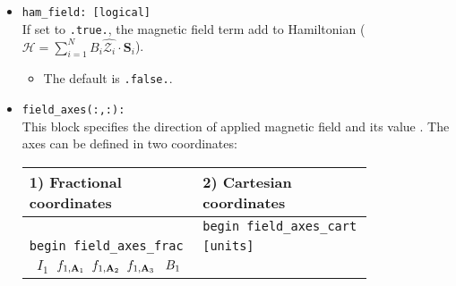 \documentclass[10pt]{report}
\def\la{\large}
\begin{document}
\begin{itemize}
\begin{itemize} [label=\adfhalfrightarrowhead]
\item {\tt ev,ang} (default)
\item {\tt ev,bohr}
\item {\tt ryd,ang} 
\item {\tt ryd,bohr}
\end{itemize}
The order of length and parameter units is not important.
If {\tt units} not present, the default value is taken.
If one of the units is not specified, the default value is set to that.
\item {\tt ham\_field: [logical]}                          \\
If set to {\tt .true.}, the magnetic field term add to Hamiltonian
($\mathcal{H}=\sum_{i=1}^{N}B_i\hat{\mathcal{Z}_{i}}\cdot\textbf{S}_i$).
\begin{itemize} [label=\adfhalfrightarrowhead]
\item The default is {\tt .false.}.
\end{itemize}
\item {\tt field\_axes(:,:):}                   \\
This block specifies the direction of applied magnetic field and its value . The axes can be defined in two coordinates:
\begin{center}
    \begin{tabular}{p{0.4\linewidth}p{0.4\linewidth}}
        \toprule
        \multicolumn{1}{l}{\la 1) Fractional coordinates} & \multicolumn{1}{l}{\la 2) Cartesian coordinates} \\ \midrule
                                 & {\tt begin field\_axes\_cart} \\
         {\tt begin field\_axes\_frac} & {\tt [units]}                   \\
        {\tt \hspace{0.2cm} $I_{1}$\hspace{0.3cm}  $ f_{1,\textbf{A}_1} \hspace{0.2cm} f_{1,\textbf{A}_2} \hspace{0.2cm} f_{1,\textbf{A}_3} \hspace{0.3cm} B_{1} $}  &

\end{tabular}
\end{center}
\end{itemize}
\end{document}
